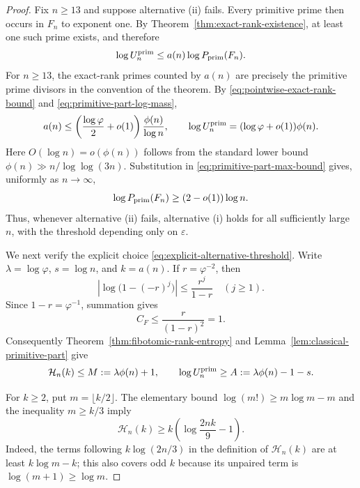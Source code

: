 \begin{proof}
Fix $n\geq13$ and suppose alternative \textup{(ii)} fails.  Every
primitive prime then occurs in $F_n$ to exponent one.  By
Theorem~\ref{thm:exact-rank-existence}, at least one such prime exists, and
therefore
\begin{equation}
\label{eq:primitive-part-max-bound}
 \log U_n^{\rm prim}
 \leq a(n)\log P_{\rm prim}(F_n).
\end{equation}
For $n\geq13$, the exact-rank primes counted by $a(n)$ are precisely the
primitive prime divisors in the convention of the theorem.  By
\eqref{eq:pointwise-exact-rank-bound} and
\eqref{eq:primitive-part-log-mass},
\[
 a(n)\leq
 \left(\frac{\log\varphi}{2}+o(1)\right)
 \frac{\phi(n)}{\log n},
 \qquad
 \log U_n^{\rm prim}
 =(\log\varphi+o(1))\phi(n).
\]
Here $O(\log n)=o(\phi(n))$ follows from the standard lower bound
$\phi(n)\gg n/\log\log(3n)$.  Substitution in
\eqref{eq:primitive-part-max-bound} gives, uniformly as $n\to\infty$,
\[
 \log P_{\rm prim}(F_n)\geq(2-o(1))\log n.
\]
Thus, whenever alternative \textup{(ii)} fails, alternative \textup{(i)}
holds for all sufficiently large $n$, with the threshold depending only on
$\varepsilon$.

We next verify the explicit choice
\eqref{eq:explicit-alternative-threshold}.  Write
$\lambda=\log\varphi$, $s=\log n$, and $k=a(n)$.  If
$r=\varphi^{-2}$, then
\[
 \left|\log\bigl(1-(-r)^j\bigr)\right|
 \leq\frac{r^j}{1-r}
 \quad(j\geq1).
\]
Since $1-r=\varphi^{-1}$, summation gives
\begin{equation}
\label{eq:explicit-binet-constant}
 C_F\leq\frac{r}{(1-r)^2}=1.
\end{equation}
Consequently Theorem~\ref{thm:fibotomic-rank-entropy} and
Lemma~\ref{lem:classical-primitive-part} give
\begin{equation}
\label{eq:explicit-count-and-mass}
 \mathcal H_n(k)\leq M:=\lambda\phi(n)+1,
 \qquad
 \log U_n^{\rm prim}\geq A:=\lambda\phi(n)-1-s.
\end{equation}

For $k\geq2$, put $m=\lfloor k/2\rfloor$.  The elementary bound
$\log(m!)\geq m\log m-m$ and the inequality $m\geq k/3$ imply
\begin{equation}
\label{eq:explicit-entropy-lower-bound}
 \mathcal H_n(k)
 \geq k\left(\log\frac{2nk}{9}-1\right).
\end{equation}
Indeed, the terms following $k\log(2n/3)$ in the definition of
$\mathcal H_n(k)$ are at least $k\log m-k$; this also covers odd $k$
because its unpaired term is $\log(m+1)\geq\log m$.


\end{proof}
